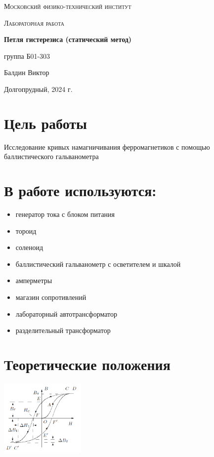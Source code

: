 \documentclass[a4paper]{article}
\begin{document}
\begin{titlepage}
	\centering
	\vspace{5cm}
	{\scshape\LARGE Московский физико-технический институт \par}
	\vspace{4cm}
	{\scshape\Large Лабораторная работа \par}
	\vspace{1cm}
	{\huge\bfseries Петля гистерезиса (статический метод) \par}
	\vspace{1cm}
	\vfill
\begin{flushright}
	{\large группа Б01-303}\par
	\vspace{0.3cm}
	{\LARGE Балдин Виктор}
\end{flushright}


	\vfill

	Долгопрудный, 2024 г.
\end{titlepage}

\section{Цель работы}
Исследование кривых намагничивания ферромагнетиков с помощью баллистического гальванометра

\section{В работе используются:}
\begin{itemize}
    \item генератор тока с блоком питания
    \item тороид
    \item соленоид
    \item баллистический гальванометр с осветителем и шкалой
    \item амперметры
    \item магазин сопротивлений
    \item лабораторный автотрансформатор
    \item разделительный трансформатор
\end{itemize}

\section{Теоретические положения}

\begin{floatingfigure}{41mm}
\noindent
\hfil
\includegraphics[width=41mm]{fig1.PNG}
\hfil
\caption{Петля гистерезиса ферромагнетика}
\label{figCurvesFF}
\end{floatingfigure}
\end{document}
